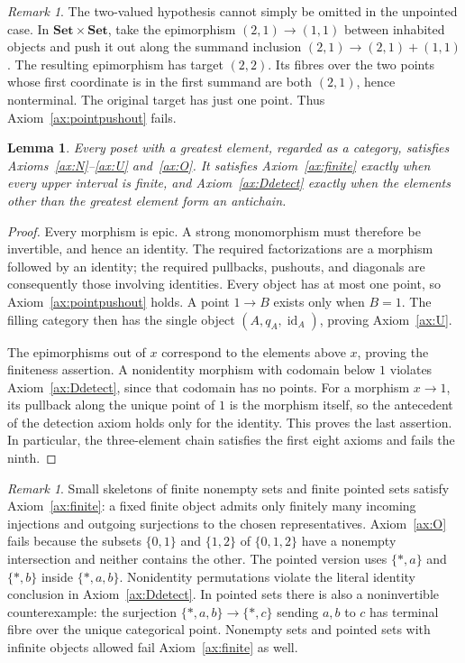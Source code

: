\documentclass[11pt,a4paper]{article}
\theoremstyle{plain}
\newtheorem{lemma}[theorem]{Lemma}
\theoremstyle{definition}
\theoremstyle{remark}
\newtheorem{remark}[theorem]{Remark}
\newcommand{\id}{\operatorname{id}}
\begin{document}
\begin{remark}\label{concl:inhabited-caution}
The two-valued hypothesis cannot simply be omitted in the
unpointed case. In $\mathbf{Set}\times\mathbf{Set}$, take the
epimorphism $(2,1)\to(1,1)$ between inhabited objects and push it
out along the summand inclusion
$(2,1)\to(2,1)+(1,1)$. The resulting epimorphism has target
$(2,2)$. Its fibres over the two points whose first coordinate is
in the first summand are both $(2,1)$, hence nonterminal.
The original target has just one point. Thus
Axiom~\ref{ax:pointpushout} fails.
\end{remark}

\begin{lemma}\label{concl:poset-examples}
Every poset with a greatest element, regarded as a category,
satisfies Axioms~\ref{ax:N}--\ref{ax:U} and~\ref{ax:O}.
It satisfies Axiom~\ref{ax:finite} exactly when every upper
interval is finite, and Axiom~\ref{ax:Ddetect} exactly when
the elements other than the greatest element form an antichain.
\end{lemma}
\begin{proof}
Every morphism is epic. A strong monomorphism must therefore be
invertible, and hence an identity. The required factorizations
are a morphism followed by an identity; the required pullbacks,
pushouts, and diagonals are consequently those involving
identities. Every object has at most one point, so
Axiom~\ref{ax:pointpushout} holds. A point $1\to B$ exists
only when $B=1$. The filling category then has the single
object $(A,q_A,\id_A)$, proving Axiom~\ref{ax:U}.

The epimorphisms out of $x$ correspond to the elements above
$x$, proving the finiteness assertion. A nonidentity morphism
with codomain below $1$ violates Axiom~\ref{ax:Ddetect}, since
that codomain has no points. For a morphism $x\to1$, its
pullback along the unique point of $1$ is the morphism itself,
so the antecedent of the detection axiom holds only for the
identity. This proves the last assertion. In particular, the
three-element chain satisfies the first eight axioms and fails
the ninth.
\end{proof}

\begin{remark}\label{concl:later-axiom-failures}
Small skeletons of finite nonempty sets and finite pointed sets
satisfy Axiom~\ref{ax:finite}: a fixed finite object admits
only finitely many incoming injections and outgoing surjections
to the chosen representatives. Axiom~\ref{ax:O} fails because
the subsets $\{0,1\}$ and $\{1,2\}$ of $\{0,1,2\}$ have
a nonempty intersection and neither contains the other. The
pointed version uses $\{*,a\}$ and $\{*,b\}$ inside
$\{*,a,b\}$. Nonidentity permutations violate the literal
identity conclusion in Axiom~\ref{ax:Ddetect}. In pointed
sets there is also a noninvertible counterexample: the surjection
$\{*,a,b\}\to\{*,c\}$ sending $a,b$ to $c$ has terminal
fibre over the unique categorical point. Nonempty sets and pointed
sets with infinite objects allowed fail Axiom~\ref{ax:finite} as well.
\end{remark}
\end{document}
